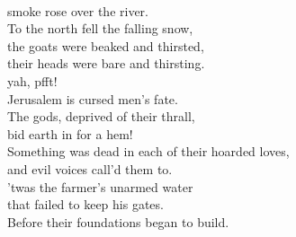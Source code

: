 \documentclass[smalldemyvopaper,11pt,twoside,onecolumn,openright,extrafontsizes]{memoir}
\begin{document}
\\smoke rose over the river.
\\To the north fell the falling snow,
\\the goats were beaked and thirsted,
\\their heads were bare and thirsting.
\\yah, pfft!
\\Jerusalem is cursed men's fate.
\\The gods, deprived of their thrall,
\\bid earth in for a hem!
\\Something was dead in each of their hoarded loves,
\\and evil voices call'd them to.
\\'twas the farmer's unarmed water
\\that failed to keep his gates.
\\Before their foundations began to build.
\end{document}
